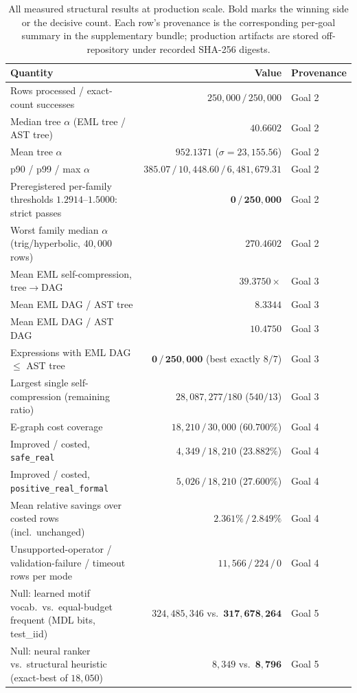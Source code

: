 \documentclass[11pt]{article}
\begin{document}
\begin{table}[t]
\centering
\footnotesize
\setlength{\tabcolsep}{4pt}
\renewcommand{\arraystretch}{1.15}
\begin{tabular}{@{}p{}rl@{}}
\toprule
\textbf{Quantity} & \textbf{Value} & \textbf{Provenance} \\
\midrule
Rows processed / exact-count successes & $250{,}000\,/\,250{,}000$ & Goal 2 \\
Median tree $\alpha$ (EML tree / AST tree) & $\mathbf{40.6602}$ & Goal 2 \\
Mean tree $\alpha$ & $952.1371$ ($\sigma=23{,}155.56$) & Goal 2 \\
p90 / p99 / max $\alpha$ & $385.07\,/\,10{,}448.60\,/\,6{,}481{,}679.31$ & Goal 2 \\
Preregistered per-family thresholds $1.2914$--$1.5000$: strict passes & $\mathbf{0\,/\,250{,}000}$ & Goal 2 \\
Worst family median $\alpha$ (trig/hyperbolic, $40{,}000$ rows) & $270.4602$ & Goal 2 \\
\midrule
Mean EML self-compression, tree$\to$DAG & $39.3750\times$ & Goal 3 \\
Mean EML DAG / AST tree & $\mathbf{8.3344}$ & Goal 3 \\
Mean EML DAG / AST DAG & $10.4750$ & Goal 3 \\
Expressions with EML DAG $\le$ AST tree & $\mathbf{0\,/\,250{,}000}$ (best exactly $8/7$) & Goal 3 \\
Largest single self-compression (remaining ratio) & $28{,}087{,}277/180$ ($540/13$) & Goal 3 \\
\midrule
E-graph cost coverage & $18{,}210\,/\,30{,}000$ ($60.700\%$) & Goal 4 \\
Improved / costed, \texttt{safe\_real} & $4{,}349\,/\,18{,}210$ ($23.882\%$) & Goal 4 \\
Improved / costed, \texttt{positive\_real\_formal} & $5{,}026\,/\,18{,}210$ ($27.600\%$) & Goal 4 \\
Mean relative savings over costed rows (incl.\ unchanged) & $2.361\%\,/\,2.849\%$ & Goal 4 \\
Unsupported-operator / validation-failure / timeout rows per mode & $11{,}566\,/\,224\,/\,0$ & Goal 4 \\
\midrule
Null: learned motif vocab.\ vs.\ equal-budget frequent (MDL bits, test\_iid) & $324{,}485{,}346$ vs.\ $\mathbf{317{,}678{,}264}$ & Goal 5 \\
Null: neural ranker vs.\ structural heuristic (exact-best of $18{,}050$) & $8{,}349$ vs.\ $\mathbf{8{,}796}$ & Goal 5 \\
\bottomrule
\end{tabular}
\caption{All measured structural results at production scale. Bold marks the
winning side or the decisive count. Each row's provenance is the corresponding
per-goal summary in the supplementary bundle; production artifacts are stored
off-repository under recorded SHA-256 digests.}
\label{tab:main}
\end{table}
\end{document}
